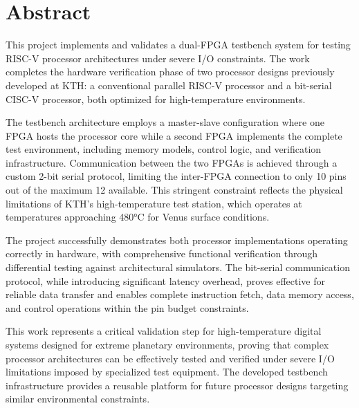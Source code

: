 \documentclass[12pt]{article}
\begin{document}
\section*{Abstract}

This project implements and validates a dual-FPGA testbench system for testing RISC-V processor architectures under severe I/O constraints. The work completes the hardware verification phase of two processor designs previously developed at KTH: a conventional parallel RISC-V processor and a bit-serial CISC-V processor, both optimized for high-temperature environments.

The testbench architecture employs a master-slave configuration where one FPGA hosts the processor core while a second FPGA implements the complete test environment, including memory models, control logic, and verification infrastructure. Communication between the two FPGAs is achieved through a custom 2-bit serial protocol, limiting the inter-FPGA connection to only 10 pins out of the maximum 12 available. This stringent constraint reflects the physical limitations of KTH's high-temperature test station, which operates at temperatures approaching 480°C for Venus surface conditions.

The project successfully demonstrates both processor implementations operating correctly in hardware, with comprehensive functional verification through differential testing against architectural simulators. The bit-serial communication protocol, while introducing significant latency overhead, proves effective for reliable data transfer and enables complete instruction fetch, data memory access, and control operations within the pin budget constraints.

This work represents a critical validation step for high-temperature digital systems designed for extreme planetary environments, proving that complex processor architectures can be effectively tested and verified under severe I/O limitations imposed by specialized test equipment. The developed testbench infrastructure provides a reusable platform for future processor designs targeting similar environmental constraints.

\noindent

\newpage

\tableofcontents
\newpage
\end{document}
